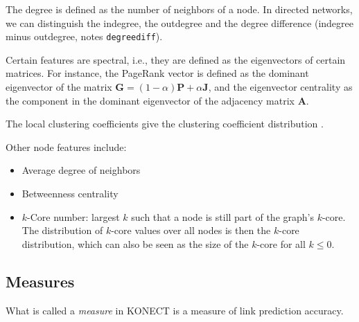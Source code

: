 \documentclass{article}
\begin{document}
The degree is defined as the number 
of neighbors of a node.  In directed networks, we can distinguish the
indegree, the outdegree and the degree difference (indegree minus
outdegree, notes \texttt{degreediff}). 

Certain features are spectral, i.e., they are defined as the
eigenvectors of certain matrices.  For instance, the PageRank vector
 is defined as the dominant eigenvector of
the matrix $\mathbf G = (1-\alpha) \mathbf P + \alpha\mathbf J$, and the
eigenvector centrality as the component in the dominant eigenvector of
the adjacency matrix $\mathbf A$. 

The local clustering coefficients give the clustering coefficient
distribution  \citep{b865}. 

Other node features include:
\begin{itemize}
\item Average degree of neighbors
\item Betweenness centrality
\item $k$-Core number:  largest $k$ such that a node is still part of
  the graph's $k$-core.  The distribution of $k$-core values over all
  nodes is then the $k$-core distribution, which can also be seen as the
  size of the $k$-core for all $k \leq 0$. 
\end{itemize}

\subsection{Measures}
What is called a \emph{measure} in KONECT is a measure of link
prediction accuracy. 
\end{document}
